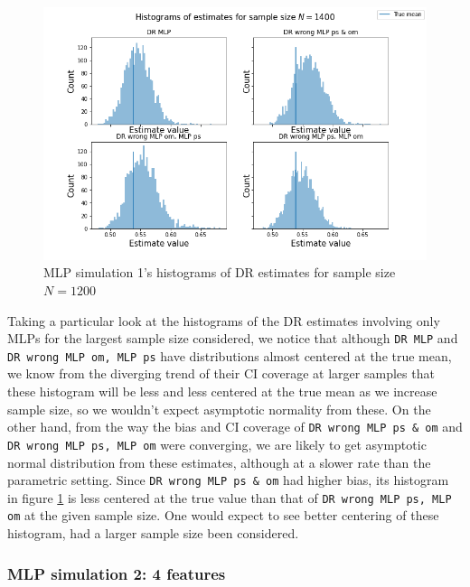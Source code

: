 \documentclass[12pt,twoside]{article}
\begin{document}
\begin{figure}[h!]
    \centering
    \includegraphics[width = 0.9\columnwidth]{figures/histMLP.png}
    \caption{MLP simulation 1's histograms of DR estimates for sample size $N = 1200$}
    \label{fighistMLP}
\end{figure}

Taking a particular look at the histograms of the DR estimates involving only MLPs for the largest sample size considered, we notice that although \texttt{DR MLP} and \texttt{DR wrong MLP om, MLP ps} have distributions almost centered at the true mean, we know from the diverging trend of their CI coverage at larger samples that these histogram will be less and less centered at the true mean as we increase sample size, so we wouldn't expect asymptotic normality from these. On the other hand, from the way the bias and CI coverage of \texttt{DR wrong MLP ps \& om} and \texttt{DR wrong MLP ps, MLP om} were converging, we are likely to get asymptotic normal distribution from these estimates, although at a slower rate than the parametric setting. Since \texttt{DR wrong MLP ps \& om} had higher bias, its histogram in figure \ref{fighistMLP} is less centered at the true value than that of \texttt{DR wrong MLP ps, MLP om} at the given sample size. One would expect to see better centering of these histogram, had a larger sample size been considered.
\clearpage
\subsubsection{MLP simulation 2: 4 features}


\clearpage
\end{document}
